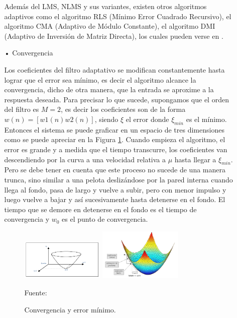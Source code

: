 \begin{enumerate}
\begin{enumerate}
Además del LMS, NLMS y sus variantes, existen otros algoritmos adaptivos como el algoritmo RLS (Mínimo Error Cuadrado Recursivo), el algoritmo CMA (Adaptivo de Módulo Constante), el algoritmo DMI (Adaptivo de Inversión de Matriz Directa), los cuales pueden verse en \citep{shubhra}.
\vskip 0.5cm
\item[•]Convergencia
\par
Los coeficientes del filtro adaptativo se modifican constantemente hasta lograr que el error sea mínimo, es decir el algoritmo alcance la convergencia, dicho de otra manera, que la entrada se aproxime a la respuesta deseada. Para precisar lo que sucede, supongamos que el orden del filtro es $M=2$, es decir los coeficientes son de la forma $w(n)=[w1(n) w2(n)]$, siendo $\xi$ el error donde $\xi_{min}$ es el mínimo.
\vskip 0.5cm
Entonces el sistema se puede graficar en un espacio de tres dimensiones como se puede apreciar en la Figura \ref{fig:figura2.20}. Cuando empieza el algoritmo, el error es grande y a medida que el tiempo transcurre, los coeficientes van descendiendo por la curva a una velocidad relativa a $\mu$ hasta llegar a $\xi_{min}$. Pero se debe tener en cuenta que este proceso no sucede de una manera trunca, sino similar a una pelota deslizándose por la pared interna cuando llega al fondo, pasa de largo y vuelve a subir, pero con menor impulso y luego vuelve a bajar y así sucesivamente hasta detenerse en el fondo. El tiempo que se demore en detenerse en el fondo es el tiempo de convergencia y $w_{0}$ es el punto de convergencia.

\begin{figure}[ht]
\begin{center}
\includegraphics[width=0.4\textwidth]{Imagenes/Cap2/image020}
\includegraphics[width=0.4\textwidth]{Imagenes/Cap2/image021}
\end{center}
\begin{center}
\vskip -0.5cm
\caption{\small{Convergencia y error mínimo.}}
\label{fig:figura2.20}
{\small{Fuente: \cite{simon}}}
\end{center}
\end{figure}


\end{enumerate}
\end{enumerate}
